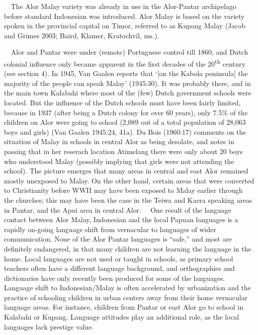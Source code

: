 \ \ The Alor Malay variety was already in use in the Alor-Pantar archipelago before standard Indonesian was introduced. Alor Malay is based on the variety spoken in the provincial capital on Timor, referred to as Kupang Malay (Jacob and Grimes 2003; Baird, Klamer, Kratochv\'il, ms.). 

\ \ Alor and Pantar were under (remote) Portuguese control till 1860, and Dutch colonial influence only became apparent in the first decades of the 20\textsuperscript{th }century (see section 4). In 1945, Van Gaalen reports that {\textquoteleft}[on the Kabola peninsula] the majority of the people can speak Malay{\textquoteright} (1945:30). It was probably there, and in the main town Kalabahi where most of the (few) Dutch government schools were located. But the influence of the Dutch schools must have been fairly limited, because in 1937 (after being a Dutch colony for over 60 years), only 7.5\% of the children on Alor were going to school (2,089 out of a total population of 28,063 boys and girls) (Van Gaalen 1945:24, 41a). Du Bois (1960:17) comments on the situation of Malay in schools in central Alor as being desolate, and notes in passing that in her reserach location Atimelang there were only about 20 boys who understood Malay (possibly implying that girls were not attending the school). The picture 
emerges that many areas in central and east Alor remained mostly unexposed to Malay. On the other hand, certain areas that were converted to Christianity before WWII may have been exposed to Malay earlier through the churches; this may have been the case in the Teiwa and Kaera speaking areas in Pantar, and the Apui area in central Alor. \ \ One result of the language contact between Alor Malay, Indonesian and the local Papuan languages is a rapidly on-going language shift from vernacular to languages of wider communication. None of the Alor Pantar languages is {\textquotedblleft}safe,{\textquotedblright} and most are definitely endangered, in that many children are not learning the language in the home. Local languages are not used or taught in schools, as primary school teachers often have a different language background, and orthographies and dictionaries have only recently been produced for some of the languages. Language shift to Indonesian/Malay is often accelerated by urbanization and the practice of 
schooling children in urban centers away from their home vernacular language areas. For instance, children from Pantar or east Alor go to school in Kalabahi or Kupang. Language attitudes play an additional role, as the local languages lack prestige value.

